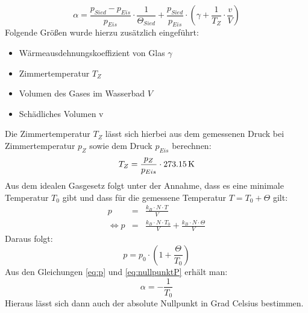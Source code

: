 \documentclass[a4paper,titlepage]{scrartcl}
\numberwithin{equation}{section}
\begin{document}
\begin{equation*}
\alpha=\frac{p_{Sied} - p_{Eis}}{p_{Eis}} \cdot \frac{1}{\Theta_{Sied}} + \frac{p_{Sied}}{p_{Eis}} \cdot \left(\gamma + \frac{1}{T_Z} \cdot \frac{v}{V}\right)
\end{equation*}
Folgende Größen wurde hierzu zusätzlich eingeführt:
\begin{itemize}
\item Wärmeausdehnungskoeffizient von Glas $\gamma$
\item Zimmertemperatur $T_Z$
\item Volumen des Gases im Wasserbad $V$
\item Schädliches Volumen v
\end{itemize}
Die Zimmertemperatur $T_Z$ lässt sich hierbei aus dem gemessenen Druck bei Zimmertemperatur $p_Z$ sowie dem Druck $p_{Eis}$ berechnen:
\begin{equation*}
T_Z=\frac{p_Z}{p_{Eis}} \cdot \unit[273.15]{K}
\end{equation*}
Aus dem idealen Gasgesetz folgt unter der Annahme, dass es eine minimale Temperatur $T_0$ gibt und dass für die gemessene Temperatur $T = T_0 + \Theta$ gilt:
\begin{eqnarray*}
p&=&\frac{k_B \cdot N \cdot T}{V}\\
\Leftrightarrow p&=&\frac{k_B \cdot N \cdot T_0}{V} + \frac{k_B \cdot N \cdot \Theta}{V}
\end{eqnarray*}
Daraus folgt:
\begin{equation}
\label{eq:nullpunktP}
p=p_0 \cdot \left(1 + \frac{\Theta}{T_0}\right)
\end{equation}
Aus den Gleichungen \ref{eq:p} und \ref{eq:nullpunktP} erhält man:
\begin{equation*}
\alpha = -\frac{1}{T_0}
\end{equation*}
Hieraus lässt sich dann auch der absolute Nullpunkt in Grad Celsius bestimmen.
\end{document}
